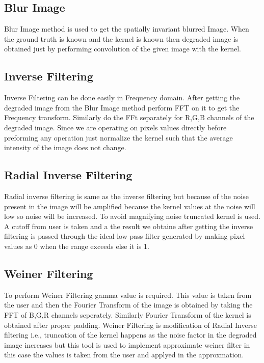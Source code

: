 \documentclass{article}
\begin{document}
\subsection{Blur Image}
Blur Image method is used to get the spatially invariant blurred Image. When the ground truth is known and the kernel is known then degraded image is obtained just by performing convolution of the given image with the kernel.
\subsection{Inverse Filtering}
Inverse Filtering can be done easily in Frequency domain. After getting the degraded image from the  Blur Image method perform FFT on it to get the Frequency transform. Similarly do the FFt separately for R,G,B channels of the degraded image. Since we are operating on pixels values directly before preforming any operation just normalize the kernel such that the average intensity of the image does not change.

\subsection{Radial Inverse Filtering}
Radial inverse filtering is same as the inverse filtering but because of the noise present in the image will be amplified because the kernel values at the noise will low so noise will be increased. To avoid magnifying noise truncated kernel is used. A cutoff from user is taken and a the result we obtaine after getting the inverse filtering is passed through the ideal low pass filter generated by making pixel values as 0 when the range exceeds else it is 1.

\subsection{Weiner Filtering}
To perform Weiner Filtering gamma value is required. This value is taken from the user and then the Fourier Transform of the image is obtained by taking the FFT of B,G,R channels seperately. Similarly Fourier Transform of the kernel is obtained after proper padding. Weiner Filtering is modification of Radial Inverse filtering i.e., truncation of the kernel happens as the noise factor in the degraded image increases but this tool is used to implement approximate weiner filter in this case the values is taken from the user and applyed in the approxmation.
\end{document}
